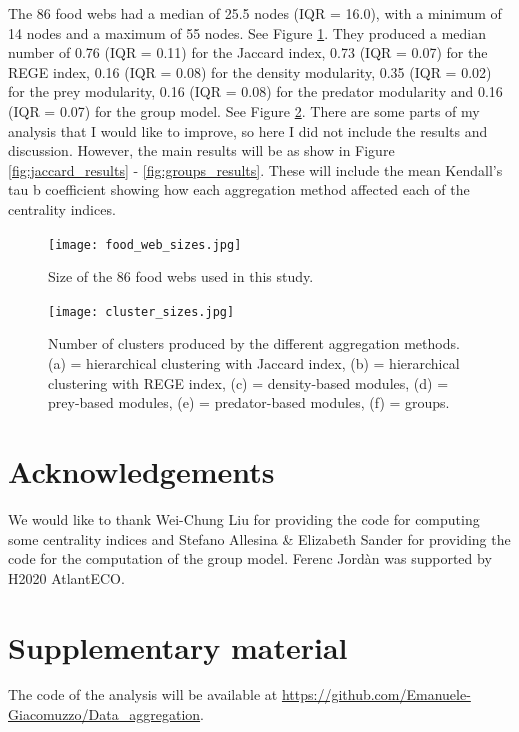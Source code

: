 \documentclass[twocolumn]{article}
\begin{document}
		The 86 food webs had a median of 25.5 nodes (IQR = 16.0), with a minimum of 14 nodes and a maximum of 55 nodes. See Figure \ref{fig:food_web_sizes}. They produced a median number of 0.76 (IQR = 0.11) for the Jaccard index, 0.73 (IQR = 0.07) for the REGE index, 0.16 (IQR = 0.08) for the density modularity, 0.35 (IQR = 0.02) for the prey modularity, 0.16 (IQR = 0.08) for the predator modularity and 0.16 (IQR = 0.07) for the group model. See Figure \ref{fig:cluster_sizes}. There are some parts of my analysis that I would like to improve, so here I did not include the results and discussion. However, the main results will be as show in Figure \ref{fig:jaccard_results} - \ref{fig:groups_results}. These will include the mean Kendall's tau b coefficient showing how each aggregation method affected each of the centrality indices.

						\begin{figure}[htbp]%
								\centering
								\texttt{[image: food\_web\_sizes.jpg]}
								\caption{Size of the 86 food webs used in this study.}
								\label{fig:food_web_sizes}
						\end{figure}

						\begin{figure}[htbp]%
								\centering
								\texttt{[image: cluster\_sizes.jpg]}
								\caption{Number of clusters produced by the different aggregation methods. (a) = hierarchical clustering with Jaccard index, (b) = hierarchical clustering with REGE index, (c) = density-based modules, (d) = prey-based modules, (e) = predator-based modules, (f) = groups.}
								\label{fig:cluster_sizes}
							\end{figure}

\section*{Acknowledgements}

	We would like to thank Wei-Chung Liu for providing the code for computing some centrality indices and Stefano Allesina \& Elizabeth Sander for providing the code for the computation of the group model. Ferenc Jordàn was supported by H2020 AtlantECO.

\section*{Supplementary material}

	The code of the analysis will be available at \url{https://github.com/Emanuele-Giacomuzzo/Data_aggregation}.
\end{document}
